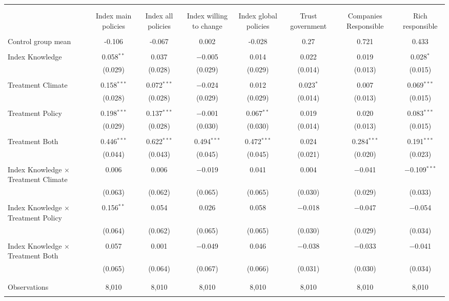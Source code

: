 
\begin{tabular}{@{\extracolsep{5pt}}lccccccc} 
\\[-1.8ex]\hline 
\hline \\[-1.8ex] 
\\[-1.8ex] & Index main policies & Index all policies & Index willing to change & Index global policies & Trust government & Companies Responsible & Rich responsible \\ 
\hline \\[-1.8ex] 
 Control group mean & -0.106 & -0.067 & 0.002 & -0.028 & 0.27 & 0.721 & 0.433  \\ \hline \\[-1.8ex] Index Knowledge & 0.058$^{**}$ & 0.037 & $-$0.005 & 0.014 & 0.022 & 0.019 & 0.028$^{*}$ \\ 
  & (0.029) & (0.028) & (0.029) & (0.029) & (0.014) & (0.013) & (0.015) \\ 
  & & & & & & & \\ 
 Treatment Climate & 0.158$^{***}$ & 0.072$^{***}$ & $-$0.024 & 0.012 & 0.023$^{*}$ & 0.007 & 0.069$^{***}$ \\ 
  & (0.028) & (0.028) & (0.029) & (0.029) & (0.014) & (0.013) & (0.015) \\ 
  & & & & & & & \\ 
 Treatment Policy & 0.198$^{***}$ & 0.137$^{***}$ & $-$0.001 & 0.067$^{**}$ & 0.019 & 0.020 & 0.083$^{***}$ \\ 
  & (0.029) & (0.028) & (0.030) & (0.030) & (0.014) & (0.013) & (0.015) \\ 
  & & & & & & & \\ 
 Treatment Both & 0.446$^{***}$ & 0.622$^{***}$ & 0.494$^{***}$ & 0.472$^{***}$ & 0.024 & 0.284$^{***}$ & 0.191$^{***}$ \\ 
  & (0.044) & (0.043) & (0.045) & (0.045) & (0.021) & (0.020) & (0.023) \\ 
  & & & & & & & \\ 
 Index Knowledge $\times$ Treatment Climate & 0.006 & 0.006 & $-$0.019 & 0.041 & 0.004 & $-$0.041 & $-$0.109$^{***}$ \\ 
  & (0.063) & (0.062) & (0.065) & (0.065) & (0.030) & (0.029) & (0.033) \\ 
  & & & & & & & \\ 
 Index Knowledge $\times$ Treatment Policy & 0.156$^{**}$ & 0.054 & 0.026 & 0.058 & $-$0.018 & $-$0.047 & $-$0.054 \\ 
  & (0.064) & (0.062) & (0.065) & (0.065) & (0.030) & (0.029) & (0.034) \\ 
  & & & & & & & \\ 
 Index Knowledge $\times$ Treatment Both & 0.057 & 0.001 & $-$0.049 & 0.046 & $-$0.038 & $-$0.033 & $-$0.041 \\ 
  & (0.065) & (0.064) & (0.067) & (0.066) & (0.031) & (0.030) & (0.034) \\ 
  & & & & & & & \\ 
\hline \\[-1.8ex] 

Observations & 8,010 & 8,010 & 8,010 & 8,010 & 8,010 & 8,010 & 8,010 \\ 
\hline 
\hline \\[-1.8ex] 
\end{tabular} 